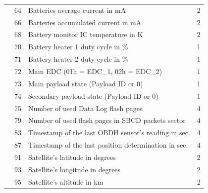\begin{longtable}[c]{lcL{0.4\textwidth}c}
	                                     & 64                & Batteries average current in mA                      & 2                       \\
	                                     & 66                & Batteries accumulated current in mA                  & 2                       \\
	                                     & 68                & Battery monitor IC temperature in K                  & 2                       \\
	                                     & 70                & Battery heater 1 duty cycle in \%                    & 1                       \\
	                                     & 71                & Battery heater 2 duty cycle in \%                    & 1                       \\
	                                     & 72                & Main EDC (01h = EDC\_1, 02h = EDC\_2)                & 1                       \\
	                                     & 73                & Main payload state (Payload ID or 0)                 & 1                       \\
	                                     & 74                & Secondary payload state (Payload ID or 0)            & 1                       \\
                                         & 75                & Number of used Data Log flash pages                  & 4                       \\
                                         & 79                & Number of used flash pages in SBCD packets sector    & 4                       \\
                                         & 83                & Timestamp of the last OBDH sensor's reading in sec.  & 4                       \\
                                         & 87                & Timestamp of the last position determination in sec. & 4                       \\
                                         & 91                & Satellite's latitude in degrees                      & 2                       \\
                                         & 93                & Satellite's longitude in degrees                     & 2                       \\
                                         & 95                & Satellite's altitude in km                           & 2                       \\

\end{longtable}
